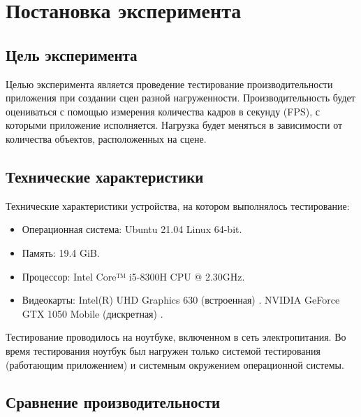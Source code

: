 \section{Постановка эксперимента}
\subsection{Цель эксперимента}

Целью эксперимента является проведение тестирование производительности приложения
при создании сцен разной нагруженности.  
Производительность будет оцениваться с помощью измерения количества кадров в секунду (FPS), 
с которыми приложение исполняется.  
Нагрузка будет меняться в зависимости от количества объектов, расположенных на сцене.  

\subsection{Технические характеристики}

Технические характеристики устройства, на котором выполнялось тестирование:

\begin{itemize}
	\item Операционная система: Ubuntu 21.04 \cite{ubuntu} Linux \cite{linux} 64-bit.
	\item Память: 19.4 GiB.
	\item Процессор: Intel Core™ i5-8300H \cite{intel} CPU @ 2.30GHz.
	\item Видеокарты: 
  \subitem Intel(R) UHD Graphics 630 (встроенная) \cite{intel-graphics}.
  \subitem NVIDIA GeForce GTX 1050 Mobile (дискретная) \cite{nvidia-gtx1050m}.
\end{itemize}
Тестирование проводилось на ноутбуке, включенном в сеть электропитания. Во время тестирования ноутбук был нагружен только системой тестирования (работающим приложением) и системным окружением операционной системы.

\subsection{Сравнение производительности}

